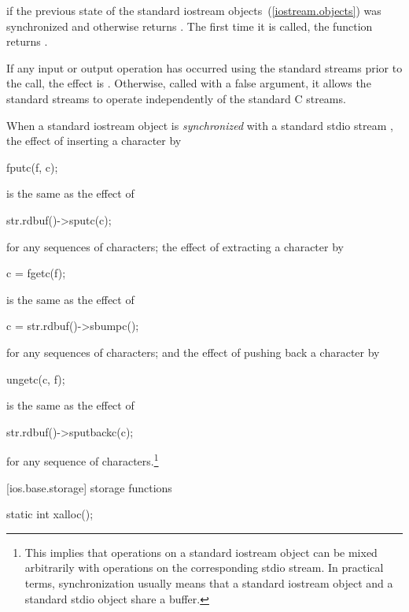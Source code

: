\begin{itemdescr}
\pnum
\returns
{}
if the previous state of the standard iostream objects~(\ref{iostream.objects})
was synchronized and otherwise returns
.
The first time it is called,
the function returns
.

\pnum
\effects
If any input or output operation has occurred using the standard streams prior to the
call, the effect is
%
.
Otherwise, called with a false argument, it allows the standard streams to
operate independently of the standard C streams.

\pnum
When a standard iostream object  is
\textit{synchronized}
with a standard stdio stream , the effect of inserting a character  by
\begin{codeblock}
fputc(f, c);
\end{codeblock}
is the same as the effect of
\begin{codeblock}
str.rdbuf()->sputc(c);
\end{codeblock}
for any sequences of characters; the effect of extracting a character  by
\begin{codeblock}
c = fgetc(f);
\end{codeblock}
is the same as the effect of
\begin{codeblock}
c = str.rdbuf()->sbumpc();
\end{codeblock}
for any sequences of characters; and the effect of pushing back a character  by
\begin{codeblock}
ungetc(c, f);
\end{codeblock}
is the same as the effect of
\begin{codeblock}
str.rdbuf()->sputbackc(c);
\end{codeblock}
for any sequence of characters.\footnote{This implies that operations on a standard iostream object can be mixed arbitrarily
with operations on the corresponding stdio stream. In practical terms, synchronization
usually means that a standard iostream object and a standard stdio object share a
buffer.
}
\end{itemdescr}

[ios.base.storage]{ storage functions}

%
\begin{itemdecl}
static int xalloc();
\end{itemdecl}

